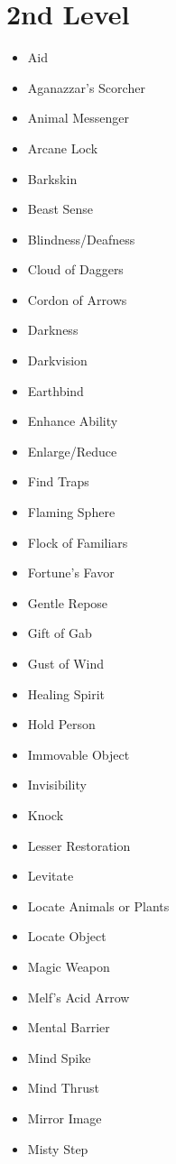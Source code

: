 \documentclass[a4paper,10pt,twoside,twocolumn, bg=print]{dndbook} %
\begin{document}
		\section{2nd Level}
			\begin{itemize}
				\item Aid
				\item Aganazzar's Scorcher
				\item Animal Messenger
				\item Arcane Lock
				\item Barkskin
				\item Beast Sense
				\item Blindness/Deafness
				\item Cloud of Daggers
				\item Cordon of Arrows
				\item Darkness
				\item Darkvision
				\item Earthbind
				\item Enhance Ability
				\item Enlarge/Reduce
				\item Find Traps
				\item Flaming Sphere
				\item Flock of Familiars
				\item Fortune's Favor
				\item Gentle Repose
				\item Gift of Gab
				\item Gust of Wind
				\item Healing Spirit
				\item Hold Person
				\item Immovable Object
				\item Invisibility
				\item Knock
				\item Lesser Restoration
				\item Levitate
				\item Locate Animals or Plants
				\item Locate Object
				\item Magic Weapon
				\item Melf's Acid Arrow
				\item Mental Barrier
				\item Mind Spike
				\item Mind Thrust
				\item Mirror Image
				\item Misty Step

\end{itemize}
\end{document}
